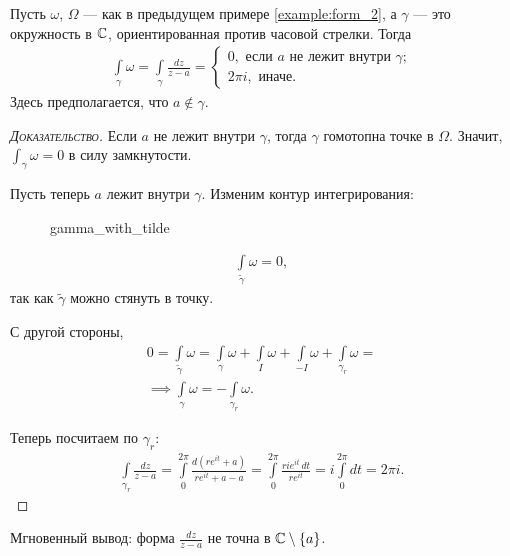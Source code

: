 \documentclass[../../main.tex]{subfiles}
\begin{document}
\begin{exmpl}
	\label{example:form_dz_div_z_minus_a}
 Пусть $\omega$, $\Omega$ --- как в предыдущем примере \ref{example:form_2}, а $\gamma$ --- это окружность в $\mathbb{C}$, ориентированная против часовой стрелки. Тогда
 \begin{align*}
  \int\limits_{\gamma} \omega = \int\limits_{\gamma} \frac{dz}{z-a} = \begin{cases}
   0, \text{ если $a$ не лежит внутри $\gamma$;}  \\
   2\pi i, \text{ иначе. }
  \end{cases} 
 \end{align*} Здесь предполагается, что $a \notin \gamma$.
\end{exmpl}
\begin{proof}[\normalfont\textsc{Доказательство}]
 Если $a$ не лежит внутри $\gamma$, тогда $\gamma$ гомотопна точке в $\Omega$. Значит, $\int_{\gamma} \omega = 0 $  в силу замкнутости.

Пусть теперь $a$  лежит внутри $\gamma$. Изменим контур интегрирования:

\begin{figure}[ht]
    \centering
    \caption{gamma_with_tilde}
    \label{fig:gamma_with_tilde}
\end{figure}

\begin{align*}
 \int\limits_{\tilde\gamma}  \omega = 0,
\end{align*} так как $\tilde\gamma$ можно стянуть в точку.

С другой стороны,
 \begin{align*}
 0 = \int\limits_{\tilde\gamma}  \omega = \int\limits_{\gamma}  \omega + \int\limits_{I}  \omega + \int\limits_{-I}   \omega + \int\limits_{\gamma_r}  \omega = \\
 \implies \int\limits_{\gamma} \omega = -\int\limits_{\gamma_r}   \omega.
\end{align*}

Теперь посчитаем по $\gamma_r$:
 \begin{align*}
 \int\limits_{\gamma_r} \frac{dz}{z - a}  = \int\limits_{0}^{2\pi}   \frac{d(re^{it} + a)}{r e^{it} + a - a} = \int\limits_{0}^{2\pi}  \frac{r i e^{it}\,dt}{r e^{it}} = i \int\limits_{0}^{2\pi} dt = 2\pi i.
\end{align*} 

\end{proof}

Мгновенный вывод: форма $\frac{dz}{z - a}$ не точна в $\mathbb{C} \setminus \left\{ a \right\}$.
\end{document}
